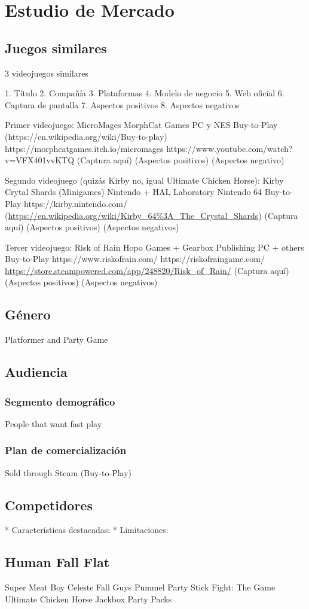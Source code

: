 \section{Estudio de Mercado}

\subsection{Juegos similares}

3 videojuegos similares

    1. Título
    2. Compañía
    3. Plataformas
    4. Modelo de negocio
    5. Web oficial
    6. Captura de pantalla
    7. Aspectos positivos
    8. Aspectos negativos

Primer videojuego:
    MicroMages
    MorphCat Games
    PC y NES
    Buy-to-Play (https://en.wikipedia.org/wiki/Buy-to-play)
    https://morphcatgames.itch.io/micromages
    https://www.youtube.com/watch?v=VFX401vvKTQ
    (Captura aquí)
    (Aspectos positivos)
    (Aspectos negativo)

Segundo videojuego (quizás Kirby no, igual Ultimate Chicken Horse):
    Kirby Crytal Shards (Minigames)
    Nintendo + HAL Laboratory
    Nintendo 64
    Buy-to-Play
    https://kirby.nintendo.com/ (\url{https://en.wikipedia.org/wiki/Kirby_64\%3A_The_Crystal_Shards})
    (Captura aquí)
    (Aspectos positivos)
    (Aspectos negativos)

Tercer videojuego:
    Risk of Rain
    Hopo Games + Gearbox Publishing
    PC + others
    Buy-to-Play
    https://www.riskofrain.com/
    https://riskofraingame.com/
    \url{https://store.steampowered.com/app/248820/Risk_of_Rain/}
    (Captura aquí)
    (Aspectos positivos)
    (Aspectos negativos)

\subsection{Género}

Platformer and Party Game

\subsection{Audiencia}

\subsubsection{Segmento demográfico}
People that want fast play

\subsubsection{Plan de comercialización}
Sold through Steam (Buy-to-Play)

\subsection{Competidores}
* Características destacadas:
    * Limitaciones:

\subsection{Human Fall Flat}
Super Meat Boy
Celeste
Fall Guys
Pummel Party
Stick Fight: The Game
Ultimate Chicken Horse
Jackbox Party Packs
